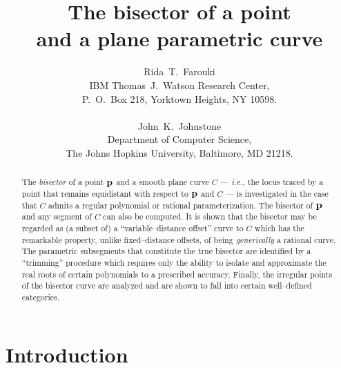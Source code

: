 \newcommand{\figg}[3]{\begin{figure}[htbp]\vspace{#3}\caption{#2}\label{#1}\end{figure}}


\title{
The bisector of a point \\
and a plane parametric curve
}

\author{
Rida~T.~Farouki \\
IBM Thomas~J.~Watson Research Center, \\
P.~O.~Box 218, Yorktown Heights, NY 10598. \\ \\
John~K.~Johnstone \\
Department of Computer Science, \\
The Johns Hopkins University, Baltimore, MD 21218.
}

\date{}

\maketitle

\begin{abstract}
The {\it bisector\/} of a point ${\bf p}$ and a smooth plane curve
$C$ --- {\it i.e.}, the locus traced by a point that remains equidistant
with respect to ${\bf p}$ and $C$ --- is investigated in the case
that $C$ admits a regular polynomial or rational parameterization.
The bisector of ${\bf p}$ and any segment of $C$ can also be computed.
It is shown that the bisector may be regarded as (a
subset of) a ``variable--distance offset'' curve to $C$ which has
the remarkable property, unlike fixed--distance offsets, of being
{\it generically\/} a rational curve. The parametric subsegments
that constitute the true bisector are identified by a ``trimming''
procedure which requires only the ability to isolate and approximate
the real roots of certain polynomials to a prescribed accuracy.
Finally, the irregular points of the bisector curve are analyzed
and are shown to fall into certain well--defined categories.
\end{abstract}

\thispagestyle{empty}\mbox{}\vfill\eject

\setcounter{page}{1}
\thispagestyle{plain}

\section{Introduction}
\label{intro}

